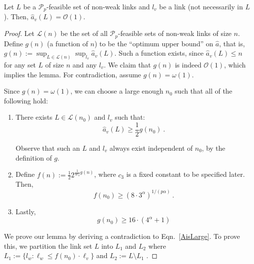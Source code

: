 \documentclass[11pt]{amsart}
\newcommand{\cal}[1]{\mathcal{#1}}
\newcommand{\BO}{\mathcal{O}}
\def\calL{{\cal L}}
\def\calP{{\cal P}}
\def\calP{{\cal P}}   \def\calM{{\cal M}}   \def\calU{{\cal U}}   \newcommand{\PCopt}{\overline{OPT}}
\newcommand{\powp}{\calP_p}
\def\fncons2{8 \cdot 3^{\alpha}}
\begin{document}
\begin{lemma}
Let $L$ be a $\powp$-feasible set of non-weak links and $l_v$ be a link (not necessarily in $L$). 
Then, $\hat{a}_v(L) = \BO(1)$.
\label{lem:constoutaff}
\end{lemma}
\begin{proof}
Let $\calL(n)$ be the set of all $\powp$-feasible sets of non-weak links of size $n$.
Define $g(n)$ (a function of $n$) to be the ``optimum upper bound'' on $\hat{a}$, that is, $g(n) := \sup_{L \in \calL(n)} \sup_{l_v} \hat{a}_v(L)$. Such a function exists, since $\hat{a}_v(L) \leq n$ for any set $L$ of size $n$ and any $l_v$. 
We claim that $g(n)$ is indeed $\BO(1)$, which implies the lemma. 
For contradiction, assume $g(n) = \omega(1)$. 

Since $g(n) = \omega(1)$, we can choose a large enough $n_0$ such that all of the following hold:
\begin{enumerate}
\renewcommand{\labelenumi}{(\alph{enumi})}

\item There exists $L \in \calL(n_0)$ and $l_v$ such that:
\begin{equation}
\hat{a}_v(L) \geq \frac{1}{2} g(n_0) \ . \label{AisLarge}
\end{equation}

Observe that such an $L$ and $l_v$ always exist independent of $n_0$, by the definition of $g$.

\item Define $f(n) :=  \frac{1}{2} 2^{\frac{1}{4c_3}g(n)}$, 
where $c_3$ is a fixed constant to be specified later.
Then,
\begin{equation}
\label{fnlarge} 
f(n_0) \ge (\fncons2)^{1/(p\alpha)}\ .
\end{equation}

\item Lastly,
\begin{equation}
\label{gnlarge} 
g(n_0) \geq 16 \cdot (4^{\alpha}+1)
\end{equation}
\end{enumerate}



We prove our lemma by deriving a contradiction to Eqn.\ \ref{AisLarge}. 
To prove this, 
we partition the link set $L$ into $L_1$ and $L_2$ where $L_1 := \{l_w : \ell_w \leq f(n_0) \cdot \ell_v\}$ and $L_2 := L \setminus L_1$ .


\end{proof}
\end{document}
